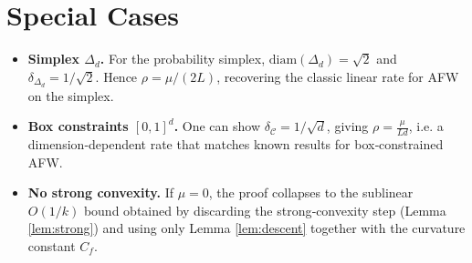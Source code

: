 \documentclass{article}
\newcommand{\C}{\mathcal{C}}
\newcommand{\diam}{\mathrm{diam}}
\begin{document}
\section*{Special Cases}
\begin{itemize}[leftmargin=*]
\item \textbf{Simplex $\Delta_{d}$.} For the probability simplex,
$\diam(\Delta_{d})=\sqrt{2}$ and $\delta_{\Delta_{d}}=1/\sqrt{2}$.
Hence $\rho=\mu/(2L)$, recovering the classic linear rate for AFW on the simplex.
\item \textbf{Box constraints $[0,1]^{d}$.} One can show $\delta_{\C}=1/\sqrt{d}$, giving
$\rho=\frac{\mu}{L d}$, i.e. a dimension‑dependent rate that matches known results for box‑constrained AFW.
\item \textbf{No strong convexity.} If $\mu=0$, the proof collapses to the sublinear $O(1/k)$ bound obtained by discarding the strong‑convexity step (Lemma \ref{lem:strong}) and using only Lemma \ref{lem:descent} together with the curvature constant $C_{f}$.
\end{itemize}
\end{document}
